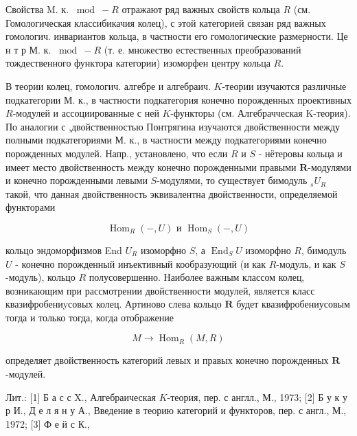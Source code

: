 \documentclass[10pt]{article}
\begin{document}
Свойства M. к. $\bmod -R$ отражают ряд важных свойств кольца $R$ (см. Гомологическая классибикачия колец), с этой категорией связан ряд важных гомологич. инвариантов кольца, в частности его гомологические размерности. Це н т р М. к. $\bmod -R$ (т. е. множество естественных преобразований тождественного функтора категории) изоморфен центру кольца $R$.



В теории колец, гомологич. алгебре и алгебраич. $K$-теории изучаются различные подкатегории М. к., в частности подкатегория конечно порожденных проективных $R$-модулей и ассоциированные с ней $K$-функторы (см. Алгебрачческая K-теория). По аналогии с ,двойственностью Понтрягина изучаются двойственности между полными подкатегориями М. к., в частности между подкатегориями конечно порожденных модулей. Напр., установлено, что если $R$ и $S$ - нётеровы кольца и имеет место двойственность между конечно порожденными правыми $\boldsymbol{R}$-модулями и конечно порожденными левыми $S$-модулями, то существует бимодуль ${ }_{s} U_{R}$ такой, что данная двойственность эквивалентна двойственности, определяемой функторами



\[

\operatorname{Hom}_{R}(-, U) \text { и } \operatorname{Hom}_{S}(-, U)

\]



кольцо эндоморфизмов End $U_{R}$ изоморфно $S$, а $\operatorname{End}_{S} U$ изоморфно $R$, бимодуль $U$ - конечно порожденный инъективный кообразующий (и как $R$-модуль, и как $S$-модуль), кольцо $R$ полусовершенно. Наиболее важным классом колец, возникающим при рассмотрении двойственности модулей, является класс квазифробениyсовых колец. Артиново слева кольцо $\boldsymbol{R}$ будет квазифробениусовым тогда и только тогда, когда отображение



\[

M \rightarrow \operatorname{Hom}_{R}(M, R)

\]



определяет двойственность категорий левых и правых конечно порожденных $\boldsymbol{R}$-модулей.



Лит.: [1] Б а с с X., Алгебраическая $K$-теория, пер. с англл., М., 1973; [2] Б у к у р И., Д е л я н у А., Введение в теорию категорий и функторов, пер. с англ., М., 1972; [3] Ф е й с К.,
\end{document}
